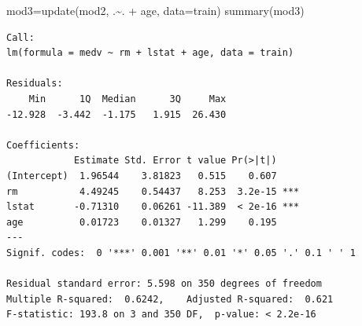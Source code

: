 \documentclass[
  8pt,
  ignorenonframetext,
]{beamer}
\newenvironment{Shaded}{\begin{snugshade}}{\end{snugshade}}
\newcommand{\AttributeTok}[1]{\textcolor[rgb]{0.77,0.63,0.00}{#1}}
\newcommand{\FunctionTok}[1]{\textcolor[rgb]{0.00,0.00,0.00}{#1}}
\newcommand{\NormalTok}[1]{#1}
\newcommand{\OtherTok}[1]{\textcolor[rgb]{0.56,0.35,0.01}{#1}}
\newcommand{\SpecialCharTok}[1]{\textcolor[rgb]{0.00,0.00,0.00}{#1}}
\begin{document}
\begin{frame}[fragile]
\footnotesize

\begin{Shaded}
\begin{Highlighting}[]
\NormalTok{mod3}\OtherTok{=}\FunctionTok{update}\NormalTok{(mod2, .}\SpecialCharTok{\textasciitilde{}}\NormalTok{. }\SpecialCharTok{+}\NormalTok{ age, }\AttributeTok{data=}\NormalTok{train)}
\FunctionTok{summary}\NormalTok{(mod3)}
\end{Highlighting}
\end{Shaded}

\begin{verbatim}
Call:
lm(formula = medv ~ rm + lstat + age, data = train)

Residuals:
    Min      1Q  Median      3Q     Max 
-12.928  -3.442  -1.175   1.915  26.430 

Coefficients:
            Estimate Std. Error t value Pr(>|t|)    
(Intercept)  1.96544    3.81823   0.515    0.607    
rm           4.49245    0.54437   8.253  3.2e-15 ***
lstat       -0.71310    0.06261 -11.389  < 2e-16 ***
age          0.01723    0.01327   1.299    0.195    
---
Signif. codes:  0 '***' 0.001 '**' 0.01 '*' 0.05 '.' 0.1 ' ' 1

Residual standard error: 5.598 on 350 degrees of freedom
Multiple R-squared:  0.6242,    Adjusted R-squared:  0.621 
F-statistic: 193.8 on 3 and 350 DF,  p-value: < 2.2e-16
\end{verbatim}

\normalsize
\end{frame}
\end{document}

